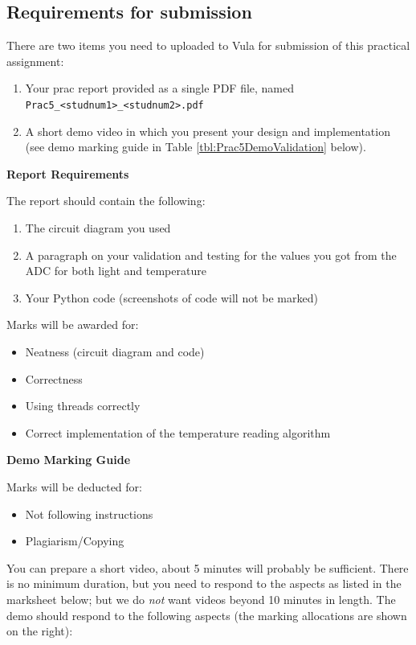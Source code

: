 \subsection{Requirements for submission}
\label{prac4sub}
There are two items you need to uploaded to Vula for submission of this practical assignment: 
\begin{enumerate}
    \item Your prac report provided as a single PDF file, named \verb|Prac5_<studnum1>_<studnum2>.pdf|
    \item A short demo video in which you present your design and implementation (see demo marking guide in Table \ref{tbl:Prac5DemoValidation} below).
\end{enumerate}


\textbf{Report Requirements}

The report should contain the following:
\begin{enumerate}
    \item The circuit diagram you used
    \item A paragraph on your validation and testing for the values you got from the ADC for both light and temperature
    \item Your Python code (screenshots of code will not be marked)
\end{enumerate}
Marks will be awarded for:
\begin{itemize}
    \item Neatness (circuit diagram and code)
    \item Correctness
    \item Using threads correctly
    \item Correct implementation of the temperature reading algorithm
\end{itemize}

\textbf{Demo Marking Guide}

Marks will be deducted for:
\begin{itemize}
    \item Not following instructions
    \item Plagiarism/Copying
\end{itemize}

You can prepare a short video, about 5 minutes will probably be sufficient. There is no minimum duration, but you need to respond to the aspects as listed in the marksheet below; but we do \textit{not} want videos beyond 10 minutes in length. The demo should respond to the following aspects (the marking allocations are shown on the right):

